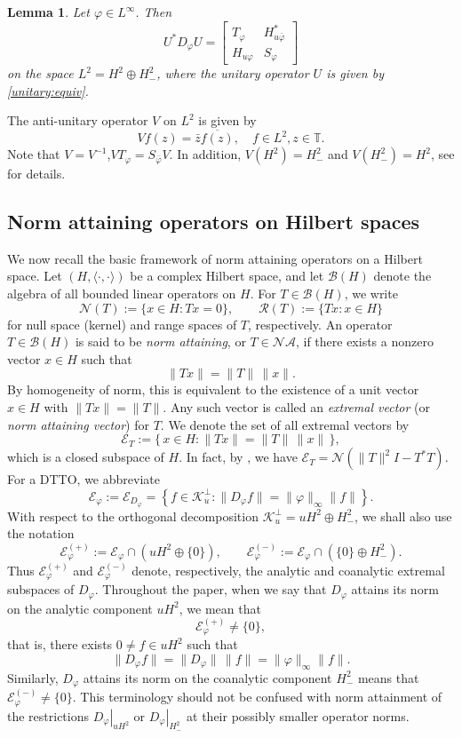 \documentclass[12pt]{amsart}
\newtheorem{lemma}[theorem]{Lemma}
\theoremstyle{definition}
\theoremstyle{remark}
\def \T{\mathbb{T}}
\newcommand{\clb}{\mathcal{B}}
\newcommand{\clr}{\mathcal{R}}
\newcommand{\cle}{\mathcal{E}}
\newcommand{\cln}{\mathcal{N}}
\newcommand{\clk}{\mathcal{K}}
\newcommand{\vp}{\varphi}
\newcommand\restr[2]{\ensuremath{\left.#1\right|_{#2}}}
\numberwithin{equation}{section}
\begin{document}
\begin{lemma}\cite{Sang:Qin:Ding}\label{block-rptn}
Let $\vp\in L^\infty$. Then
\[U^*D_\vp U= \begin{bmatrix}
	T_\vp & H^*_{u\bar{\vp}}\\
	H_{u\vp} & S_\vp
\end{bmatrix}\]
on the space $L^2 = H^2\oplus H^2_{-}$, where the unitary operator $U$ is given by \eqref{unitary:equiv}.
\end{lemma}

The anti-unitary operator $V$ on $L^2$ is given by
\begin{equation}
Vf(z)=\bar{z}\overline{f(z)}, \quad f\in L^2, z\in \T.
\end{equation}
Note that $V=V^{-1}$,\quad $VT_\vp=S_{\bar{\vp}}V$. In addition, $V(H^2)=H^2_{-}$ and $V(H^2_{-})=H^2$, see \cite{Guediri} for details.
 


\subsection{Norm attaining operators on Hilbert spaces}

We now recall the basic framework of norm attaining operators on a Hilbert space. Let $(H,\langle\cdot,\cdot\rangle)$ be a complex Hilbert space, and let $\clb(H)$ denote the algebra of all bounded linear operators on $H$. For $T\in\clb(H)$, we write
\[
\cln(T) := \{x\in H : Tx=0\},\qquad \clr(T) := \{Tx:x\in H\}
\]
for null space (kernel) and range spaces of $T$, respectively.
An operator $T\in\clb(H)$ is said to be \emph{norm attaining}, or $T\in\mathcal{NA}$, if there exists a nonzero vector $x\in H$ such that
$$
\|Tx\|=\|T\|\,\|x\|.
$$
By homogeneity of norm, this is equivalent to the existence of a unit vector $x\in H$ with $\|Tx\|=\|T\|$. Any such vector is called an \emph{extremal vector} (or \emph{norm attaining vector}) for $T$. We denote the set of all extremal vectors by
$$
\cle_T := \{\,x\in H :  \|Tx\|=\|T\|\,\|x\|\,\},
$$
which is a closed subspace of $H$. In fact, by \cite[Lemma 3.1]{Ramesh}, we have $\cle_T =\cln(\|T\|^2I - T^*T)$. For a DTTO, we abbreviate
\[
\cle_\vp:=\cle_{D_\vp}
=\left\{f\in\clk_u^\perp:\|D_\vp f\|=\|\vp\|_\infty\|f\|
\right\}.
\]
With respect to the orthogonal decomposition $\clk_u^\perp=uH^2\oplus H^2_{-}$, we shall also use the notation
\[
\cle_\vp^{(+)}
:=\cle_\vp\cap\left(uH^2\oplus\{0\}\right),
\qquad\cle_\vp^{(-)}:=
\cle_\vp\cap\left(\{0\}\oplus H^2_{-}\right).
\]
Thus $\cle_\vp^{(+)}$ and $\cle_\vp^{(-)}$ denote, respectively,
the analytic and coanalytic extremal subspaces of $D_\vp$. Throughout the paper, when we say that $D_\vp$ attains its norm
on the analytic component $uH^2$, we mean that
\[
\cle_\vp^{(+)}\neq\{0\},
\]
that is, there exists $0\neq f\in uH^2$ such that
\[
\|D_\vp f\|=\|D_\vp\|\,\|f\|
=\|\vp\|_\infty\|f\|.
\]
Similarly, $D_\vp$ attains its norm on the coanalytic component
$H^2_{-}$ means that $\cle_\vp^{(-)}\neq\{0\}$.
This terminology should not be confused with norm attainment of
the restrictions $\restr{D_\vp}{uH^2}$ or $\restr{D_\vp}{H^2_{-}}$ at their possibly smaller operator norms.
\end{document}
